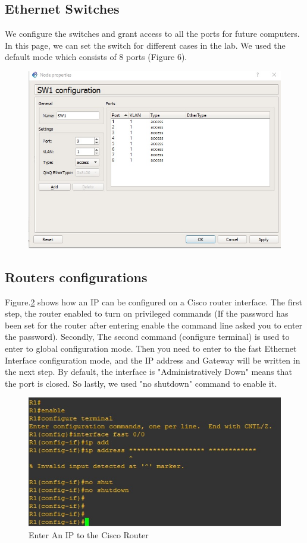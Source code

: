 \documentclass{article}
\begin{document}
\subsection{Ethernet Switches}
We configure the switches and grant access to all the ports for future computers.
In this page, we can set the switch for different cases in the lab. We used the
default mode which consists of 8 ports (Figure 6).

\begin{figure}[H]
	\begin{center}
		\includegraphics[width=0.6
\textwidth]{Switchconf.jpg}
	\end{center}
	\caption{\small  \newline}
	\label{fig:Prd}
\end{figure}

\subsection{Routers configurations}

Figure.\ref{fig:Termconf} shows how an IP can be configured on a Cisco router interface. The first step, the router enabled to turn on privileged commands (If the password has been set for the router after entering enable the command line asked you to enter the password). Secondly, The second command (configure terminal) is used to enter to global configuration mode. Then you need to enter to the fast Ethernet Interface configuration mode, and the IP address and Gateway will be written in the next step. By default, the interface is "Administratively Down" means that the port is closed. So lastly, we used "no shutdown" command to enable it.

\begin{figure}[H]
	\begin{center}
		\includegraphics[width=0.6
\textwidth]{Terminalconf.jpg}
	\end{center}
	\caption{\small Enter An IP to the Cisco Router \newline}
	\label{fig:Termconf}
\end{figure}
\end{document}
